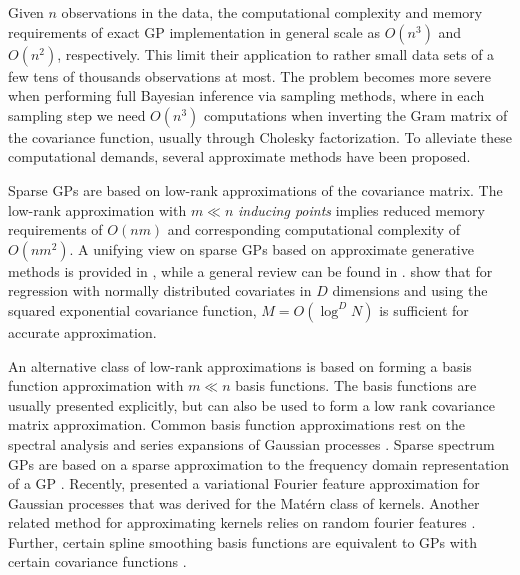 \documentclass[]{interact}
\theoremstyle{plain}%
\theoremstyle{definition}
\theoremstyle{remark}
\begin{document}
Given $n$ observations in the data, the computational complexity and memory requirements of exact GP implementation in general scale as $O(n^3)$ and $O(n^2)$, respectively. This limit their application to rather small data sets of a few tens of thousands observations at most. The problem becomes more severe when performing full Bayesian inference via sampling methods, where in each sampling step we need $O(n^3)$ computations when inverting the Gram matrix of the covariance function, usually through Cholesky factorization. To alleviate these computational demands, several approximate methods have been proposed. 

Sparse GPs are based on low-rank approximations of the covariance matrix. The low-rank approximation with $m \ll n$ {\it inducing points} implies reduced memory requirements of $O(nm)$ and corresponding computational complexity of $O(nm^2)$.
A unifying view on sparse GPs based on approximate generative methods
is provided in \cite{quinonero2005unifying}, while a general review
can be found in \cite{rasmussen2006gaussian}. \citet{Burt+Rasmussen+vanderWilk:2019} show that for regression with normally distributed covariates in $D$ dimensions and using the squared exponential covariance function, $M=O(\log^DN)$ is sufficient for accurate approximation.

An alternative class of low-rank approximations is based on forming a basis function approximation with $m \ll n$ basis functions. The basis functions are usually presented explicitly, but can also be used to form a low rank covariance matrix approximation. Common basis function approximations rest on the spectral analysis and series expansions of Gaussian processes \citep{loeve1977probability,trees1968detection,adler1981geometry,cramer2013stationary}.
Sparse spectrum GPs are based on a sparse approximation to the frequency domain representation of a GP \citep{lazaro2010sparse,quia2010sparse,gal2015improving}. Recently, \cite{hensman2017variational} presented a variational Fourier feature approximation for Gaussian processes that was derived for the Mat{\'e}rn class of kernels. Another related method for approximating kernels relies on random fourier features \citep{rahimi2008random,rahimi2009weighted}.
Further, certain spline smoothing basis functions are equivalent to GPs with certain covariance functions \citep{wahba1990spline,Furrer+Nychka:2007}.
\end{document}
